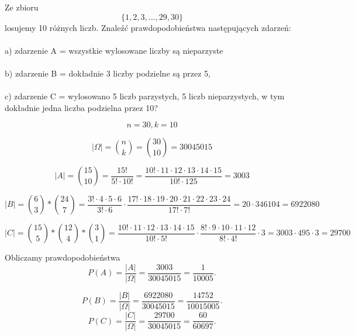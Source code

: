 \medskip
{} 
\medskip

Ze zbioru
\[
 \{1, 2, 3,... ,29, 30\}
\]
 losujemy 10 różnych liczb. Znaleźć prawdopodobieństwa następujących zdarzeń:
 \\
\\a) zdarzenie A = wszystkie wylosowane liczby są nieparzyste
\\
\\ b) zdarzenie B = dokładnie 3 liczby podzielne są przez 5,
\\
\\ c) zdarzenie C = wylosowano 5 liczb parzystych, 5 liczb nieparzystych, w tym dokładnie jedna liczba podzielna przez 10?

\[
n=30,k=10
\]

\[
|\Omega|={n \choose k}={30 \choose 10} = 30045015
\]

\[
|A|={15 \choose 10} = \frac{15!}{5!\cdot10!} = \frac{10 !\cdot 11 \cdot 12 \cdot 13 \cdot 14 \cdot 15}{10! \cdot 125} = 3003
\]

\[
|B|={6 \choose 3} * {24 \choose 7} = \frac{3! \cdot 4 \cdot 5 \cdot 6}{3! \cdot 6} \cdot \frac{17!\cdot18\cdot19\cdot20\cdot21\cdot22\cdot23\cdot24}{17!\cdot7!}= 20 \cdot 346104 = 6 922 080 
\]

\[|C|={15 \choose 5} * {12 \choose 4} * {3 \choose 1} = \frac{10! \cdot 11 \cdot 12 \cdot 13 \cdot 14 \cdot 15}{10! \cdot 5!}  \cdot \frac{8!\cdot9\cdot10\cdot11\cdot12}{8!\cdot4!} \cdot 3= 3003 \cdot 495 \cdot 3 = 29 700\]

Obliczamy prawdopodobieństwa
\[
P(A)=\frac{|A|}{|\Omega|}=\frac{3003}{30045015}=\frac{1}{10005}.
\]

\[
P(B)=\frac{|B|}{|\Omega|}=\frac{ 6 922 080 }{30045015}=\frac{14752}{10 015 005}.
\]
\[
P(C)=\frac{|C|}{|\Omega|}=\frac{ 29 700}{30045015}=\frac{60}{60697}.
\]
